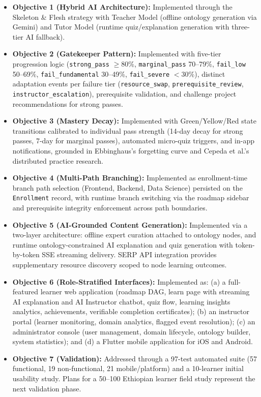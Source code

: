 \begin{itemize}
    \item \textbf{Objective 1 (Hybrid AI Architecture):} Implemented through the Skeleton \& Flesh strategy with Teacher Model (offline ontology generation via Gemini) and Tutor Model (runtime quiz/explanation generation with three-tier AI fallback).
    \item \textbf{Objective 2 (Gatekeeper Pattern):} Implemented with five-tier progression logic (\texttt{strong\_pass} $\ge$80\%, \texttt{marginal\_pass} 70--79\%, \texttt{fail\_low} 50--69\%, \texttt{fail\_fundamental} 30--49\%, \texttt{fail\_severe} $<$30\%), distinct adaptation events per failure tier (\texttt{resource\_swap}, \texttt{prerequisite\_review}, \texttt{instructor\_escalation}), prerequisite validation, and challenge project recommendations for strong passes.
    \item \textbf{Objective 3 (Mastery Decay):} Implemented with Green/Yellow/Red state transitions calibrated to individual pass strength (14-day decay for strong passes, 7-day for marginal passes), automated micro-quiz triggers, and in-app notifications, grounded in Ebbinghaus's forgetting curve and Cepeda et al.'s distributed practice research.
    \item \textbf{Objective 4 (Multi-Path Branching):} Implemented as enrollment-time branch path selection (Frontend, Backend, Data Science) persisted on the \texttt{Enrollment} record, with runtime branch switching via the roadmap sidebar and prerequisite integrity enforcement across path boundaries.
    \item \textbf{Objective 5 (AI-Grounded Content Generation):} Implemented via a two-layer architecture: offline expert curation attached to ontology nodes, and runtime ontology-constrained AI explanation and quiz generation with token-by-token SSE streaming delivery. SERP API integration provides supplementary resource discovery scoped to node learning outcomes.
    \item \textbf{Objective 6 (Role-Stratified Interfaces):} Implemented as: (a) a full-featured learner web application (roadmap DAG, learn page with streaming AI explanation and AI Instructor chatbot, quiz flow, learning insights analytics, achievements, verifiable completion certificates); (b) an instructor portal (learner monitoring, domain analytics, flagged event resolution); (c) an administrator console (user management, domain lifecycle, ontology builder, system statistics); and (d) a Flutter mobile application for iOS and Android.
    \item \textbf{Objective 7 (Validation):} Addressed through a 97-test automated suite (57 functional, 19 non-functional, 21 mobile/platform) and a 10-learner initial usability study. Plans for a 50--100 Ethiopian learner field study represent the next validation phase.

\end{itemize}
